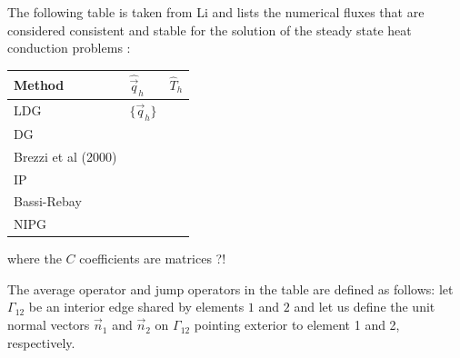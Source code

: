The following table is taken from Li \cite{li06} and lists the numerical fluxes 
that are considered consistent and stable for the solution of the steady state heat conduction 
problems \cite{arbc02,cacp00}:
\begin{center}
\begin{tabular}{lll}
\hline
Method & $\hat{\vec{q}}_h$ & $\hat{T}_h$ \\
\hline
LDG \cite{cosh98} & $\{ \vec{q}_h \}$  & \\
DG  \cite{cacp00} & \\
Brezzi et al (2000) \cite{brmm00} &\\
IP \cite{dodu76} & \\
Bassi-Rebay \cite{barm97} &\\
NIPG \cite{riwg99} & \\
\hline
\end{tabular}
\end{center}
where the $C$ coefficients are matrices ?!



The average operator and jump operators in the table are defined as follows:
let $\Gamma_{12}$ be an interior edge shared by elements $1$ and $2$ and let us 
define the unit normal vectors $\vec{n}_1$ and $\vec{n}_2$ on $\Gamma_{12}$ 
pointing exterior to element 1 and 2, respectively.





